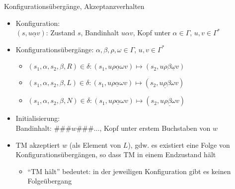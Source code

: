 \begin{frame}{Konfigurationsübergänge, Akzeptanzverhalten}
	\begin{itemize}
		\item Konfiguration:\\
		$(s, u\underline{\alpha}v)$: Zustand $s$, Bandinhalt $u\alpha v$, Kopf unter $\alpha \in \Gamma$, $u,v \in \Gamma^*$
		\item Konfigurationsübergänge: $\alpha, \beta, \rho, \omega \in \Gamma$, $u, v \in \Gamma^*$
		\begin{itemize}
			\item $(s_1, \alpha, s_2, \beta, R) \in \delta:$\qquad $(s_1, u\rho\underline{\alpha}\omega v) \mapsto (s_2, u\rho\beta\underline{\omega}v)$
			\item $(s_1, \alpha, s_2, \beta, L) \in \delta:$\qquad $(s_1, u\rho\underline{\alpha}\omega v) \mapsto (s_2, u\underline{\rho}\beta\omega v)$
			\item $(s_1, \alpha, s_2, \beta, N) \in \delta:$\qquad $(s_1, u\rho\underline{\alpha}\omega v) \mapsto (s_2, u\rho\underline{\beta}\omega v)$
		\end{itemize}
		\item Initialisierung:\\
		Bandinhalt: $\#\#\# w\#\#\#\ldots$, Kopf unter erstem Buchstaben von $w$
		\item TM akzeptiert $w$ (als Element von $L$), gdw. es existiert eine Folge von Konfigurationsübergängen, so dass TM in einem Endzustand hält
		\begin{itemize}
			\item "`TM hält"' bedeutet: in der jeweiligen Konfiguration gibt es keinen Folgeübergang
		\end{itemize}
	\end{itemize}
\end{frame}